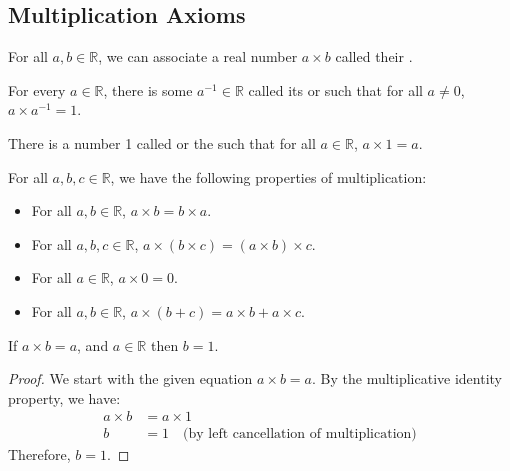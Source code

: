 \documentclass[11pt]{article}
\begin{document}
\subsection{Multiplication Axioms}

\begin{definition}
    For all $a, b \in \mathbb{R}$, we can associate a real number $a \times b$ called their .
\end{definition}

\begin{definition}
    For every $a \in \mathbb{R}$, there is some $a^{-1} \in \mathbb{R}$ called its  or  such that for all $a \neq 0$, $a \times a^{-1} = 1$.
\end{definition}

\begin{definition}
    There is a number 1 called  or the  such that for all $a \in \mathbb{R}$, $a \times 1 = a$.
\end{definition}

\begin{definition}
    For all $a, b, c \in \mathbb{R}$, we have the following properties of multiplication:
    \begin{itemize}
        \item For all $a, b \in \mathbb{R}$, $a \times b = b \times a$.
        \item For all $a, b, c \in \mathbb{R}$, $a \times (b \times c) = (a \times b) \times
                  c$.
        \item For all $a \in \mathbb{R}$, $a \times 0 = 0$.
        \item For all $a, b \in \mathbb{R}$, $a \times (b + c) = a \times b + a \times c$.
    \end{itemize}
\end{definition}

\begin{proposition}
    If $a \times b = a$, and $a \in \mathbb{R}$ then $b = 1$.
\end{proposition}

\begin{proof}
    We start with the given equation $a \times b = a$. By the multiplicative identity property, we have:
    \begin{align*}
        a \times b & = a \times 1                                              \\
        b          & = 1 \quad \text{(by left cancellation of multiplication)}
    \end{align*}
    Therefore, $b = 1$.
\end{proof}
\end{document}
